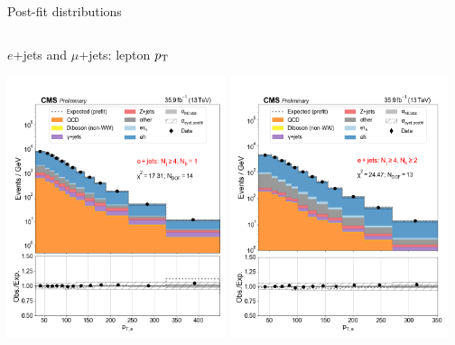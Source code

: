 \begin{frame}{Post-fit distributions}
\begin{columns}
        \begin{tcolorbox}{\smaller $e$+jets and $\mu$+jets: lepton $p_{\mathrm{T}}$}
            \begin{center}
                \includegraphics[width=0.48\textwidth]{chapters/Analysis/sectionStatisticalAnalysis/figures/fit/ejet_cat_gt4_eq1}
                \includegraphics[width=0.48\textwidth]{chapters/Analysis/sectionStatisticalAnalysis/figures/fit/ejet_cat_gt4_gt2}


\end{center}
\end{tcolorbox}
\end{columns}
\end{frame}
